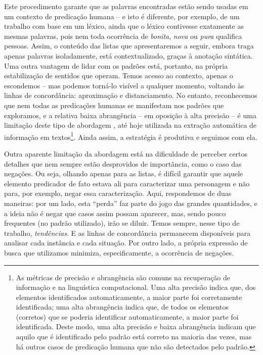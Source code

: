 \documentclass[portuguese]{textolivre}
\begin{document}
Este procedimento garante que as palavras encontradas estão sendo usadas em um contexto de predicação humana – e isto é diferente, por exemplo, de um trabalho com base em um léxico, ainda que o léxico contivesse exatamente as mesmas palavras, pois nem toda ocorrência de \textit{bonita}, \textit{nova} ou \textit{pura} qualifica pessoas. Assim, o conteúdo das listas que apresentaremos a seguir, embora traga apenas palavras isoladamente, está contextualizado, graças à anotação sintática. Uma outra vantagem de lidar com os padrões está, portanto, na própria estabilização de sentidos que operam. Temos acesso ao contexto, apenas o escondemos – mas podemos torná-lo visível a qualquer momento, voltando às linhas de concordância: aproximação e distanciamento. No entanto, reconhecemos que nem todas as predicações humanas se manifestam nos padrões que exploramos, e a relativa baixa abrangência – em oposição à alta precisão – é uma limitação deste tipo de abordagem \cite{hearst1992}, até hoje utilizada na extração automática de informação em textos\footnote{As métricas de precisão e abrangência são comuns na recuperação de informação e na linguística computacional. Uma alta precisão indica que, dos elementos identificados automaticamente, a maior parte foi corretamente identificada; uma alta abrangência indica que, de todos os elementos (corretos) que se poderia identificar automaticamente, a maior parte foi identificada. Deste modo, uma alta precisão e baixa abrangência indicam que aquilo que é identificado pelo padrão está correto na maioria das vezes, mas há outros casos de predicação humana que não são detectados pelo padrão.}. Ainda assim, a estratégia é produtiva e seguimos com ela.   

Outra aparente limitação da abordagem está na dificuldade de perceber certos detalhes que nem sempre estão desprovidos de importância, como o caso das negações. Ou seja, olhando apenas para as listas, é difícil garantir que aquele elemento predicador de fato estava ali para caracterizar uma personagem e não para, por exemplo, negar essa caracterização. Aqui, respondemos de duas maneiras: por um lado, esta “perda” faz parte do jogo das grandes quantidades, e a ideia não é negar que casos assim possam aparecer, mas, sendo pouco frequentes (no padrão utilizado), irão se diluir. Temos sempre, nesse tipo de trabalho, \textit{tendências}. E as linhas de concordância permanecem disponíveis para analisar cada instância e cada situação. Por outro lado, a própria expressão de busca que utilizamos minimiza, especificamente, a ocorrência de negações.        
\end{document}
